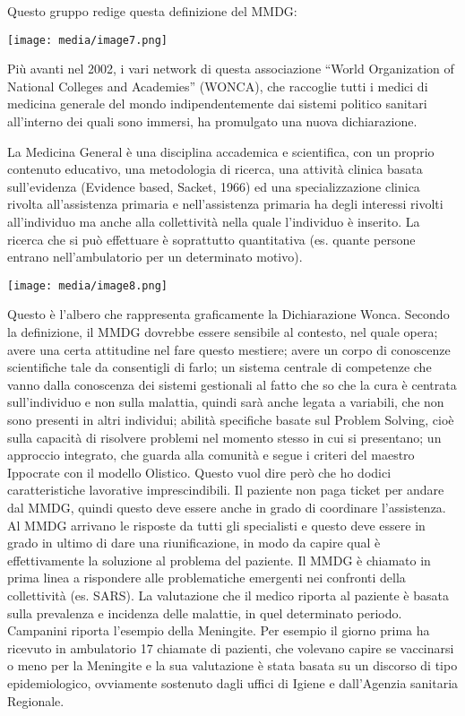 \documentclass[]{article}
\begin{document}
Questo gruppo redige questa definizione del MMDG:

\texttt{[image: media/image7.png]}

Più avanti nel 2002, i vari network di questa associazione ``World
Organization of National Colleges and Academies'' (WONCA), che raccoglie
tutti i medici di medicina generale del mondo indipendentemente dai
sistemi politico sanitari all'interno dei quali sono immersi, ha
promulgato una nuova dichiarazione.

La Medicina General è una disciplina accademica e scientifica, con un
proprio contenuto educativo, una metodologia di ricerca, una attività
clinica basata sull'evidenza (Evidence based, Sacket, 1966) ed una
specializzazione clinica rivolta all'assistenza primaria e
nell'assistenza primaria ha degli interessi rivolti all'individuo ma
anche alla collettività nella quale l'individuo è inserito. La ricerca
che si può effettuare è soprattutto quantitativa (es. quante persone
entrano nell'ambulatorio per un determinato motivo).

\texttt{[image: media/image8.png]}

Questo è l'albero che rappresenta graficamente la Dichiarazione Wonca.
Secondo la definizione, il MMDG dovrebbe essere sensibile al contesto,
nel quale opera; avere una certa attitudine nel fare questo mestiere;
avere un corpo di conoscenze scientifiche tale da consentigli di farlo;
un sistema centrale di competenze che vanno dalla conoscenza dei sistemi
gestionali al fatto che so che la cura è centrata sull'individuo e non
sulla malattia, quindi sarà anche legata a variabili, che non sono
presenti in altri individui; abilità specifiche basate sul Problem
Solving, cioè sulla capacità di risolvere problemi nel momento stesso in
cui si presentano; un approccio integrato, che guarda alla comunità e
segue i criteri del maestro Ippocrate con il modello Olistico. Questo
vuol dire però che ho dodici caratteristiche lavorative imprescindibili.
Il paziente non paga ticket per andare dal MMDG, quindi questo deve
essere anche in grado di coordinare l'assistenza. Al MMDG arrivano le
risposte da tutti gli specialisti e questo deve essere in grado in
ultimo di dare una riunificazione, in modo da capire qual è
effettivamente la soluzione al problema del paziente. Il MMDG è chiamato
in prima linea a rispondere alle problematiche emergenti nei confronti
della collettività (es. SARS). La valutazione che il medico riporta al
paziente è basata sulla prevalenza e incidenza delle malattie, in quel
determinato periodo. Campanini riporta l'esempio della Meningite. Per
esempio il giorno prima ha ricevuto in ambulatorio 17 chiamate di
pazienti, che volevano capire se vaccinarsi o meno per la Meningite e la
sua valutazione è stata basata su un discorso di tipo epidemiologico,
ovviamente sostenuto dagli uffici di Igiene e dall'Agenzia sanitaria
Regionale.
\end{document}
